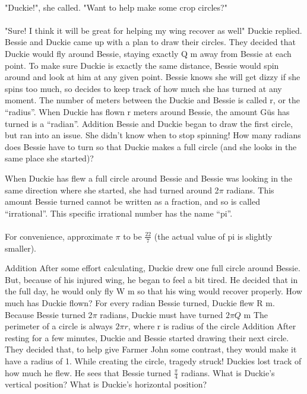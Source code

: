 \documentclass[a4paper,11pt ]{book}
\begin{document}
\paragraph{} "Duckie!", she called. "Want to help make some crop circles?"
\paragraph{} "Sure! I think it will be great for helping my wing recover as well" Duckie replied.
\vfill
\pagebreak
 {Bessie and Duckie came up with a plan to draw their circles. They decided that Duckie would fly around Bessie, staying exactly Q m away from Bessie at each point. To make sure Duckie is exactly the same distance, Bessie would spin around and look at him at any given point. Bessie knows she will get dizzy if she spins too much, so decides to keep track of how much she has turned at any moment.}
 {}
 {The number of meters between the Duckie and Bessie is called r, or the “radius”. When Duckie has flown r meters around Bessie, the amount Güs has turned is a “radian”.}
 {Addition}
 {Bessie and Duckie began to draw the first circle, but ran into an issue. She didn't know when to stop spinning! How many radians does Bessie have to turn so that Duckie makes a full circle (and she looks in the same place she started)?}
 {}
 {When Duckie has flew a full circle around Bessie and Bessie was looking in the same direction where she started, she had turned around 2$\pi$ radians. This amount Bessie turned cannot be written as a fraction, and so is called “irrational”. This specific irrational number has the name “pi”. 
 \paragraph{} For convenience, approximate $\pi$ to be $\frac{22}{7}$ (the actual value of pi is slightly smaller).}
 {Addition}
 {After some effort calculating, Duckie drew one full circle around Bessie. But, because of his injured wing, he began to feel a bit tired. He decided that in the full day, he would only fly W m so that his wing would recover properly. How much has Duckie flown?}
 {For every radian Bessie turned, Duckie flew R m. Because Bessie turned 2$\pi$ radians, Duckie must have turned $2\pi Q$ m}
 {The perimeter of a circle is always $2\pi r$, where r is radius of the circle}
 {Addition}
 {After resting for a few minutes, Duckie and Bessie started drawing their next circle. They decided that, to help give Farmer John some contrast, they would make it have a radius of 1. While creating the circle, tragedy struck! Duckies lost track of how much he flew. He sees that Bessie turned $\frac{\pi}{4}$ radians. What is Duckie's vertical position? What is Duckie's horizontal position?}
\end{document}
